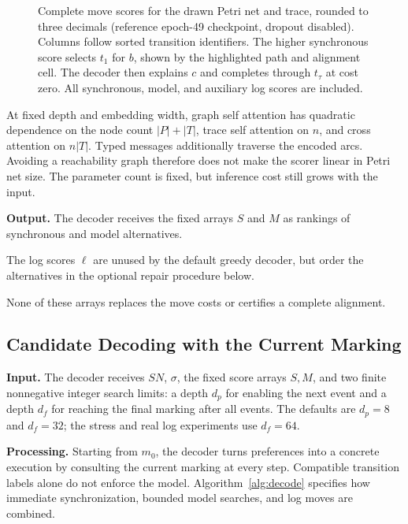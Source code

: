 \begin{figure}[!t]
\centering

\caption{Complete move scores for the drawn Petri net and trace, rounded to three decimals (reference epoch-49 checkpoint, dropout disabled). Columns follow sorted transition identifiers. The higher synchronous score selects $t_1$ for $b$, shown by the highlighted path and alignment cell. The decoder then explains $c$ and completes through $t_\tau$ at cost zero. All synchronous, model, and auxiliary log scores are included.}
\label{fig:examplescores}
\end{figure}

At fixed depth and embedding width, graph self attention has quadratic dependence on the node count $|P|+|T|$, trace self attention on $n$, and cross attention on $n|T|$. Typed messages additionally traverse the encoded arcs. Avoiding a reachability graph therefore does not make the scorer linear in Petri net size. The parameter count is fixed, but inference cost still grows with the input.

\textbf{Output.} The decoder receives the fixed arrays $S$ and $M$ as rankings of synchronous and model alternatives. \begin{revised}The log scores $\ell$ are unused by the default greedy decoder, but order the alternatives in the optional repair procedure below.\end{revised} None of these arrays replaces the move costs or certifies a complete alignment.

\subsection{Candidate Decoding with the Current Marking}
\label{sec:decoder}

\textbf{Input.} The decoder receives $SN$, $\sigma$, the fixed score arrays $S,M$, and two finite nonnegative integer search limits: a depth $d_p$ for enabling the next event and a depth $d_f$ for reaching the final marking after all events. The defaults are $d_p=8$ and $d_f=32$; the stress and real log experiments use $d_f=64$.

\textbf{Processing.} Starting from $m_0$, the decoder turns preferences into a concrete execution by consulting the current marking at every step. Compatible transition labels alone do not enforce the model. Algorithm~\ref{alg:decode} specifies how immediate synchronization, bounded model searches, and log moves are combined.

